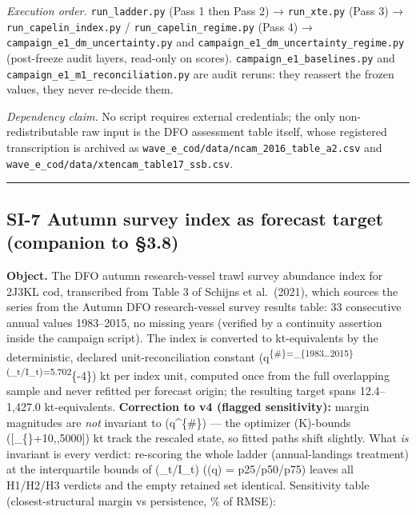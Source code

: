 \documentclass[11pt]{article}
\begin{document}
\emph{Execution order.} \texttt{run\_ladder.py} (Pass 1 then Pass 2) →
\texttt{run\_xte.py} (Pass 3) → \texttt{run\_capelin\_index.py} /
\texttt{run\_capelin\_regime.py} (Pass 4) →
\texttt{campaign\_e1\_dm\_uncertainty.py} and
\texttt{campaign\_e1\_dm\_uncertainty\_regime.py} (post-freeze audit
layers, read-only on scores). \texttt{campaign\_e1\_baselines.py} and
\texttt{campaign\_e1\_m1\_reconciliation.py} are audit reruns: they
reassert the frozen values, they never re-decide them.

\emph{Dependency claim.} No script requires external credentials; the
only non-redistributable raw input is the DFO assessment table itself,
whose registered transcription is archived as
\texttt{wave\_e\_cod/data/ncam\_2016\_table\_a2.csv} and
\texttt{wave\_e\_cod/data/xtencam\_table17\_ssb.csv}.

\begin{center}\rule{0.5\linewidth}{0.5pt}\end{center}

\subsection{SI-7 Autumn survey index as forecast target (companion to
§3.8)}\label{si-7-autumn-survey-index-as-forecast-target-companion-to-3.8}

\textbf{Object.} The DFO autumn research-vessel trawl survey abundance
index for 2J3KL cod, transcribed from Table 3 of Schijns et al.~(2021),
which sources the series from the Autumn DFO research-vessel survey
results table: 33 consecutive annual values 1983--2015, no missing years
(verified by a continuity assertion inside the campaign script). The
index is converted to kt-equivalents by the deterministic, declared
unit-reconciliation constant
(q\textsuperscript{\{\#\}=\_\{1983\dots2015\}(\_t/I\_t)=5.702}\{-4\})
kt per index unit, computed once from the full overlapping sample and
never refitted per forecast origin; the resulting target spans
12.4--1,427.0 kt-equivalents. \textbf{Correction to v4 (flagged
sensitivity):} margin magnitudes are \emph{not} invariant to
(q\^{}\{\#\}) --- the optimizer (K)-bounds
({[}\max\_\{\}+10,,5000{]}) kt track the rescaled state, so
fitted paths shift slightly. What \emph{is} invariant is every verdict:
re-scoring the whole ladder (annual-landings treatment) at the
interquartile bounds of (\_t/I\_t) ((q) = p25/p50/p75)
leaves all H1/H2/H3 verdicts and the empty retained set identical.
Sensitivity table (closest-structural margin vs persistence, \% of
RMSE):
\end{document}
